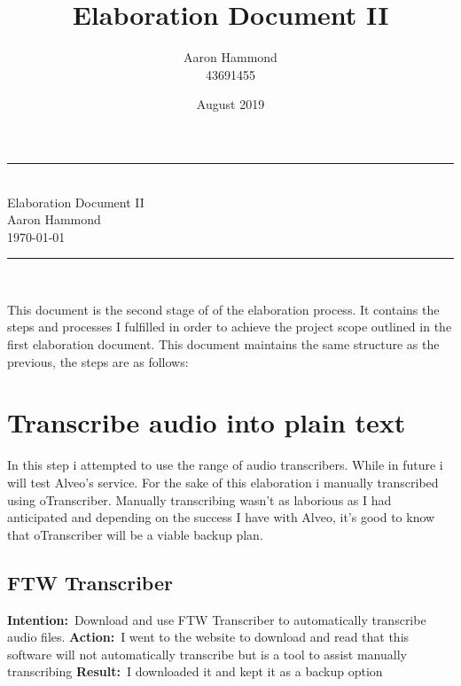 \documentclass{article}
\title{Elaboration Document II}
\author{Aaron Hammond\\43691455}
\date{August 2019}
\newcommand\HRule{\rule{\textwidth}{1pt}} %
\newcommand{\intention}[1]{\noindent \textbf{Intention:}{\textnormal\ #1} \newline}
\newcommand{\action}[1]{\textbf{Action:}{\textnormal\ #1} \newline}
\newcommand{\result}[1]{\textbf{Result:}{\textnormal\ #1} \newline}
\begin{document}

\begin{titlepage}


\begin{center}
\HRule\\[0.4cm]
\huge{Elaboration Document II}\\[0.5cm]
\huge{Aaron Hammond}\\
\large{\today}\\[0.4cm]

\HRule \\[1cm]
\end{center}

\begin{justify}
\noindent This document is the second stage of of the elaboration process. It contains the steps and processes I fulfilled in order to achieve the project scope outlined in the first elaboration document. This document maintains the same structure as the previous, the steps are as follows:
\end{justify}


\def\contentsname{\empty} %
\tableofcontents

\end{titlepage}


\section{Transcribe audio into plain text}
In this step i attempted to use the range of audio transcribers. While in future i will test Alveo's service. For the sake of this elaboration i manually transcribed using oTranscriber. Manually transcribing wasn't as laborious as I had anticipated and depending on the success I have with Alveo, it's good to know that oTranscriber will be a viable backup plan.

\subsection{FTW Transcriber}
\intention{Download and use FTW Transcriber to automatically transcribe audio files.}
\action{I went to the website to download and read that this software will not automatically transcribe but is a tool to assist manually transcribing}
\result{I downloaded it and kept it as a backup option}
\end{document}
